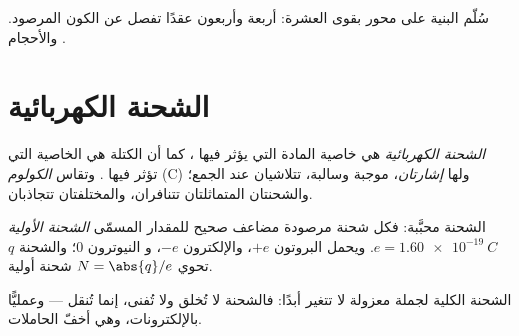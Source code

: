 \begin{omfigure}

{\small سُلّم البنية على محور بقوى العشرة: أربعة وأربعون
عقدًا تفصل  عن الكون المرصود. والأحجام
.}
\end{omfigure}

\section{الشحنة الكهربائية}

\begin{definition}\label{def:g11:fundamental-interactions:charge}
\emph{الشحنة الكهربائية} هي خاصية المادة
التي يؤثر فيها ، كما أن الكتلة هي الخاصية
التي تؤثر فيها . وتقاس  \emph{الكولوم}
(\unit{C}) ولها \emph{إشارتان}، موجبة وسالبة، تتلاشيان
عند الجمع؛ والشحنتان المتماثلتان تتنافران، والمختلفتان تتجاذبان.
\end{definition}

\begin{definition}\label{def:g11:fundamental-interactions:elementary}
الشحنة محبَّبة: فكل شحنة مرصودة مضاعف صحيح للمقدار المسمّى
\emph{الشحنة الأولية}
$e = \qty{1.60e-19}{C}$. ويحمل البروتون $+e$، والإلكترون $-e$، و
النيوترون $0$؛ والشحنة $q$ تحوي $N = \abs{q}/e$ شحنة أولية.
\end{definition}

\begin{proposition}\label{prop:g11:fundamental-interactions:conservation}
الشحنة الكلية لجملة معزولة لا تتغير أبدًا: فالشحنة لا تُخلق
ولا تُفنى، إنما تُنقل --- وعمليًّا بالإلكترونات،
وهي أخفّ الحاملات.
\end{proposition}
\admitted

